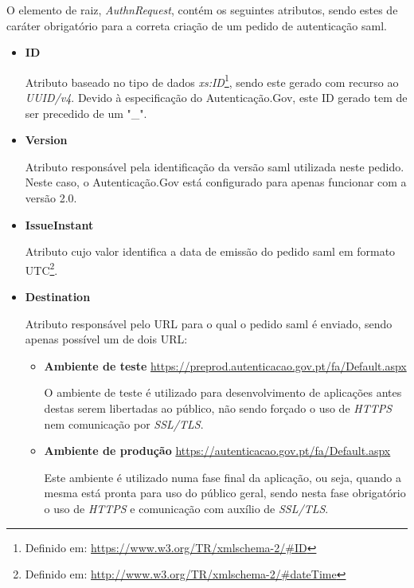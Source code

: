 \vspace{-13mm}
O elemento de raiz, \emph{AuthnRequest}, contém os seguintes atributos, sendo estes de caráter obrigatório para a correta criação de um pedido de autenticação \gls{saml}.
\vspace{-3mm}
\begin{itemize}
    \item \textbf{ID}
    
    Atributo baseado no tipo de dados \emph{xs:ID}\footnote{Definido em: \url{https://www.w3.org/TR/xmlschema-2/\#ID}}, sendo este gerado com recurso ao \emph{UUID\//v4}. Devido à especificação do Autenticação.Gov, este ID gerado tem de ser precedido de um "\_".
    
    \item \textbf{Version}
    
    Atributo responsável pela identificação da versão \gls{saml} utilizada neste pedido. Neste caso, o Autenticação.Gov está configurado para apenas funcionar com a versão 2.0.
    
    \item \textbf{IssueInstant}
    
    Atributo cujo valor identifica a data de emissão do pedido \gls{saml} em formato UTC\footnote{Definido em: \url{http://www.w3.org/TR/xmlschema-2/\#dateTime}}.
    
    \item \textbf{Destination}
    
    Atributo responsável pelo URL para o qual o pedido \gls{saml} é enviado, sendo apenas possível um de dois URL:
    \begin{itemize}
        \item \textbf{Ambiente de teste } \url{https://preprod.autenticacao.gov.pt/fa/Default.aspx}
        
        O ambiente de teste é utilizado para desenvolvimento de aplicações antes destas serem libertadas ao público, não sendo forçado o uso de \emph{HTTPS} nem comunicação por \emph{SSL/TLS}.
        
        \item \textbf{Ambiente de produção } \url{https://autenticacao.gov.pt/fa/Default.aspx} 
        
        Este ambiente é utilizado numa fase final da aplicação, ou seja, quando a mesma está pronta para uso do público geral, sendo nesta fase obrigatório o uso de \emph{HTTPS} e comunicação com auxílio de \emph{SSL/TLS}.
    \end{itemize}
    

\end{itemize}
